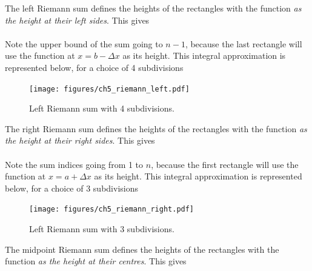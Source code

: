 The left Riemann sum defines the heights of the rectangles with the function \textit{as the height at their left sides}. This gives  \\

\noindent {} \\

\noindent Note the upper bound of the sum going to $n-1$, because the last rectangle will use the function at $x = b-\Delta x$ as its height. This integral approximation is represented below, for a choice of 4 subdivisions
\begin{figure}[H]
	\begin{center}
	\texttt{[image: figures/ch5\_riemann\_left.pdf]} 
	  \caption{Left Riemann sum with 4 subdivisions.} \label{fig:ch5_riemann_left}
	\end{center}
\end{figure}


The right Riemann sum defines the heights of the rectangles with the function \textit{as the height at their right sides}. This gives  \\

\noindent {} \\
\noindent Note the sum indices going from 1 to $n$, because the first rectangle will use the function at $x = a+\Delta x$ as its height. This integral approximation is represented below, for a choice of 3 subdivisions
\begin{figure}[H]
	\begin{center}
	\texttt{[image: figures/ch5\_riemann\_right.pdf]} 
	  \caption{Left Riemann sum with 3 subdivisions.} \label{fig:ch5_riemann_right}
	\end{center}
\end{figure}

The midpoint Riemann sum defines the heights of the rectangles with the function \textit{as the height at their centres}. This gives  \\

